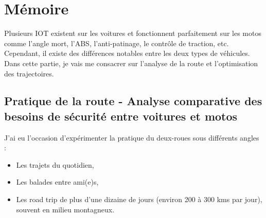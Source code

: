 \section{Mémoire}


Plusieurs IOT existent sur les voitures et fonctionnent parfaitement sur les motos comme l'angle mort, l'ABS, l'anti-patinage, le contrôle de traction, etc. Cependant, il existe des différences notables entre les deux types de véhicules. Dans cette partie, je vais me consacrer sur l'analyse de la route et l'optimisation des trajectoires.


\subsection{Pratique de la route - Analyse comparative des besoins de sécurité entre voitures et motos}



J’ai eu l’occasion d’expérimenter la pratique du deux-roues sous différents angles :\
\begin{itemize}
    \item Les trajets du quotidien,
    \item Les balades entre ami(e)s,
    \item Les road trip de plus d'une dizaine de jours (environ 200 à 300 kms par jour), souvent en milieu montagneux.
\end{itemize}

